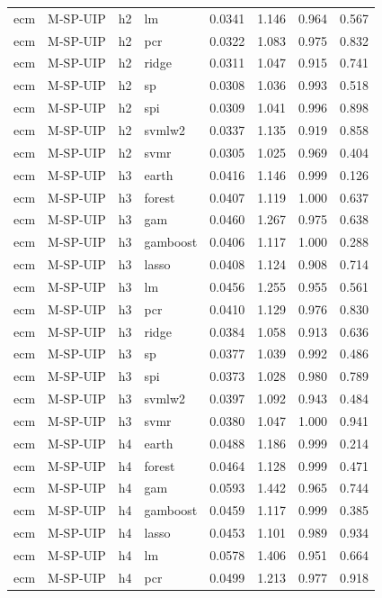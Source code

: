 \begin{ThreePartTable}
\begin{longtable}[t]{llclcccc}
ecm & M-SP-UIP & h2 & lm & 0.0341 & 1.146 & 0.964 & 0.567\\
ecm & M-SP-UIP & h2 & pcr & 0.0322 & 1.083 & 0.975 & 0.832\\
ecm & M-SP-UIP & h2 & ridge & 0.0311 & 1.047 & 0.915 & 0.741\\
ecm & M-SP-UIP & h2 & sp & 0.0308 & 1.036 & 0.993 & 0.518\\
ecm & M-SP-UIP & h2 & spi & 0.0309 & 1.041 & 0.996 & 0.898\\
ecm & M-SP-UIP & h2 & svmlw2 & 0.0337 & 1.135 & 0.919 & 0.858\\
ecm & M-SP-UIP & h2 & svmr & 0.0305 & 1.025 & 0.969 & 0.404\\
\addlinespace
ecm & M-SP-UIP & h3 & earth & 0.0416 & 1.146 & 0.999 & 0.126\\
ecm & M-SP-UIP & h3 & forest & 0.0407 & 1.119 & 1.000 & 0.637\\
ecm & M-SP-UIP & h3 & gam & 0.0460 & 1.267 & 0.975 & 0.638\\
ecm & M-SP-UIP & h3 & gamboost & 0.0406 & 1.117 & 1.000 & 0.288\\
ecm & M-SP-UIP & h3 & lasso & 0.0408 & 1.124 & 0.908 & 0.714\\
ecm & M-SP-UIP & h3 & lm & 0.0456 & 1.255 & 0.955 & 0.561\\
ecm & M-SP-UIP & h3 & pcr & 0.0410 & 1.129 & 0.976 & 0.830\\
ecm & M-SP-UIP & h3 & ridge & 0.0384 & 1.058 & 0.913 & 0.636\\
ecm & M-SP-UIP & h3 & sp & 0.0377 & 1.039 & 0.992 & 0.486\\
ecm & M-SP-UIP & h3 & spi & 0.0373 & 1.028 & 0.980 & 0.789\\
ecm & M-SP-UIP & h3 & svmlw2 & 0.0397 & 1.092 & 0.943 & 0.484\\
ecm & M-SP-UIP & h3 & svmr & 0.0380 & 1.047 & 1.000 & 0.941\\
\addlinespace
ecm & M-SP-UIP & h4 & earth & 0.0488 & 1.186 & 0.999 & 0.214\\
ecm & M-SP-UIP & h4 & forest & 0.0464 & 1.128 & 0.999 & 0.471\\
ecm & M-SP-UIP & h4 & gam & 0.0593 & 1.442 & 0.965 & 0.744\\
ecm & M-SP-UIP & h4 & gamboost & 0.0459 & 1.117 & 0.999 & 0.385\\
ecm & M-SP-UIP & h4 & lasso & 0.0453 & 1.101 & 0.989 & 0.934\\
ecm & M-SP-UIP & h4 & lm & 0.0578 & 1.406 & 0.951 & 0.664\\
ecm & M-SP-UIP & h4 & pcr & 0.0499 & 1.213 & 0.977 & 0.918\\

\end{longtable}
\end{ThreePartTable}
